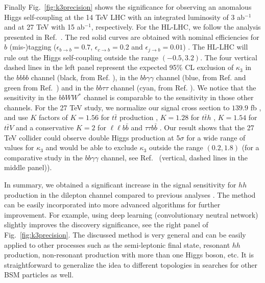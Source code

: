 Finally Fig.~\ref{fig:k3precision} shows the significance for observing an anomalous Higgs self-coupling at the 14 TeV LHC with an integrated luminosity of 3 ab$^{-1}$ and at 27 TeV with 15 ab$^{-1}$, respectively. 
For the HL-LHC, we follow the analysis presented in Ref.~\cite{Kim:2018cxf}.
The red solid curves are obtained with nominal efficiencies for $b$ (mis-)tagging ($\epsilon_{b \to b} = 0.7$, $\epsilon_{c \to b} = 0.2$ and $\epsilon_{j \to b} = 0.01$) \cite{Sirunyan:2017ezt}. 
The HL-LHC will rule out the Higgs self-coupling outside the range $(-0.5, 3.2)$. The four vertical dashed lines in the left panel represent the expected 95\% CL exclusion of $\kappa_3$ in the $bbbb$ channel (black, from Ref. \cite{ATL-PHYS-PUB-2016-024}), in the $bb\gamma\gamma$ channel (blue, from Ref. \cite{Kling:2016lay} and green from Ref.~\cite{ATL-PHYS-PUB-2017-001}) and in the $bb\tau\tau$ channel (cyan, from Ref. \cite{Kim:2018uty}). We notice that the sensitivity in the $bbWW^*$ channel is comparable to the sensitivity in those other channels.  
For the 27 TeV study, we normalize our signal cross section to $139.9$ fb \cite{Grazzini:2018bsd}, and use $K$ factors of $K=1.56$ for $t\bar t$ production \cite{27TeV:ttbar}, $K=1.28$ for $t\bar  t h$ \cite{Demartin:2014fia}, $K=1.54$ for $t \bar t V$ and a conservative $K=2$ for $\ell\ell b \bar b$ and $\tau\tau b\bar b$ \cite{Kim:2018cxf}. 
Our result shows that the 27 TeV collider could observe double Higgs production at 5$\sigma$ for a wide range of values for $\kappa_3$ and would be able to exclude $\kappa_3$ outside the range $(0.2, 1.8)$ (for a comparative study in the $bb\gamma\gamma$ channel, see Ref.~\cite{Goncalves:2018qas} (vertical, dashed lines in the middle panel)).


In summary, we obtained a significant increase in the signal sensitivity for $hh$ production in the dilepton channel compared to previous analyses \cite{CMS:2015nat,CMS:2017cwx,Adhikary:2017jtu}. 
The method can be easily incorporated into more advanced algorithms for further improvement. 
For example, using deep learning (convolutionary neutral network) slightly improves the discovery significance, see the right panel of Fig.~\ref{fig:k3precision}.
The discussed method is very general and can be easily applied to other processes such as the semi-leptonic final state, resonant $hh$ production, non-resonant production with more than one Higgs boson, etc. It is straightforward to generalize the idea to different topologies in searches for other BSM particles as well.









